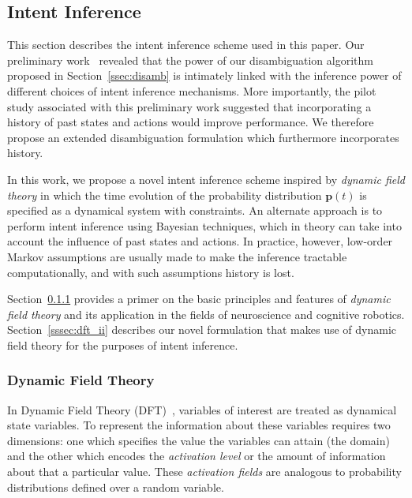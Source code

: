 \subsection{Intent Inference}\label{ssec:inference}
This section describes the intent inference scheme used in this paper. Our preliminary work~\cite{gopinath2017mode} revealed that the power of our disambiguation algorithm proposed in Section~\ref{ssec:disamb} is intimately linked with the inference power of different choices of intent inference mechanisms. More importantly, the pilot study associated with this preliminary work suggested that incorporating a history of past states and actions would improve performance. We therefore propose an extended disambiguation formulation which furthermore incorporates history.

In this work, we propose a novel intent inference scheme inspired by \textit{dynamic field theory} in which the time evolution of the probability distribution $\boldsymbol{p}(t)$ is specified as a dynamical system with constraints. An alternate approach is to perform intent inference using Bayesian techniques, which in theory can take into account the influence of past states and actions. In practice, however, low-order Markov assumptions are usually made to make the inference tractable computationally, and with such assumptions history is lost.

 Section~\ref{sssec:dft} provides a primer on the basic principles and features of \textit{dynamic field theory} and its application in the fields of neuroscience and cognitive robotics. Section~\ref{sssec:dft_ii} describes our novel formulation that makes use of dynamic field theory for the purposes of intent inference. 

\subsubsection{Dynamic Field Theory}\label{sssec:dft}

In Dynamic Field Theory (DFT)~\cite{schoner2015dynamic}, variables of interest are treated as dynamical state variables. To represent the information about these variables requires two dimensions: one which specifies the value the variables can attain (the domain) and the other which encodes the \textit{activation level} or the amount of information about that a particular value. These \textit{activation fields} are analogous to probability distributions defined over a random variable. 


